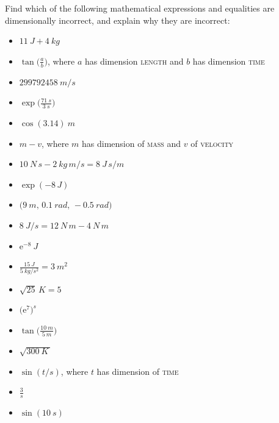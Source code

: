\documentclass[a4paper,12pt,%
onecolumn,oneside,%
british%
]{memoir}
\newcommand*{\e}{\ensuremath{\mathrm{e}}}
\renewcommand*{\|}[1][]{\nonscript\:#1\vert\nonscript\:\mathopen{}}
\begin{document}
Find which of the following mathematical expressions and equalities are dimensionally incorrect, and explain why they are incorrect:
\begin{itemize}[label=$\triangleright$\enskip,itemsep=1ex]
\item $\displaystyle\qty{11}{J} + \qty{4}{kg}$%
\item $\displaystyle\tan\biggl(\frac{a}{b}\biggr)$, where $a$ has dimension \textsc{length} and $b$ has dimension \textsc{time}%
\item $\displaystyle\qty{299792458}{m/s}$
\item $\displaystyle\exp\biggl(\frac{\qty{71}{s}}{\qty{3}{s}}\biggr)$
\item $\displaystyle\cos(\num{3.14})\:\unit{m}$
\item $\displaystyle m - v$, where $m$ has dimension of \textsc{mass} and $v$ of \textsc{velocity}%
\item $\displaystyle \qty{10}{N\, s}-\qty{2}{kg\, m/s} = \qty{8}{J\, s/m}$
\item $\displaystyle\exp(-8\,\unit{J})$%
\item $\displaystyle\bigl(\qty{9}{m},\, \qty{0.1}{rad},\, -\qty{0.5}{rad}\bigr)$
\item $\displaystyle\qty{8}{J/s}=\qty{12}{N\,m}-\qty{4}{N\,m}$%
\item $\displaystyle\e^{-8}\:\unit{J}$
\item $\displaystyle\frac{\qty{15}{J}}{\qty{5}{kg/s^{2}}} = \qty{3}{m^{2}}$
\item $\displaystyle \sqrt{25}\,\unit{K} = 5$%
\item $\displaystyle\bigl(\e^{7}\bigr)^{\unit{s}}$%
\item $\displaystyle\tan\biggl(\frac{\qty{10}{m}}{\qty{5}{m}}\biggr)$
\item $\displaystyle\sqrt{\qty{300}{K}\,}$
\item $\displaystyle\sin(t/\unit{s})$, where $t$ has dimension of \textsc{time}
\item $\displaystyle\frac{3}{\unit{s}}$
\item $\displaystyle\sin(\qty{10}{s})$%
\end{itemize}
\end{document}
